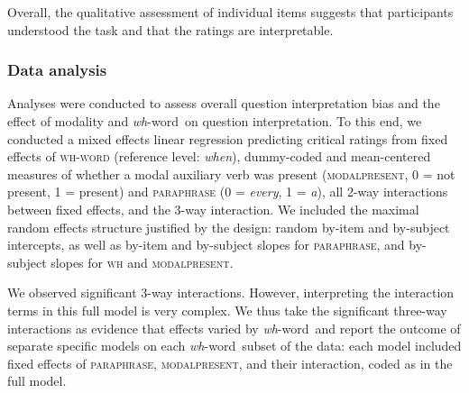\documentclass[12pt,letterpaper,table,svgnames,dvipsnames]{article}
\newcommand{\whw}{\emph{wh}-word~}
\begin{document}
Overall, the qualitative assessment of individual items suggests that participants understood the task and that the ratings are interpretable.

\subsubsection{Data analysis}

Analyses were conducted to assess overall question interpretation bias and the effect of modality and \whw on question interpretation. To this end, we conducted a mixed effects linear regression predicting critical ratings from fixed effects of \textsc{wh-word} (reference level: \emph{when}), dummy-coded and mean-centered measures of whether a modal auxiliary verb was present (\textsc{modalpresent}, 0 = not present, 1 = present) and \textsc{paraphrase} (0 = \emph{every}, 1 = \emph{a}), all 2-way interactions between fixed effects, and the 3-way interaction. We included the maximal random effects structure justified by the design: random by-item and by-subject intercepts, as well as by-item and by-subject slopes for \textsc{paraphrase}, and by-subject slopes for \textsc{wh} and \textsc{modalpresent}. 

We observed significant 3-way interactions. However, interpreting the interaction terms in this full model is very complex. We thus take the significant three-way interactions as evidence that effects varied by \whw and report the outcome of separate specific models on each \whw subset of the data: each model included fixed effects of \textsc{paraphrase}, \textsc{modalpresent}, and their interaction, coded as in the full model. 
\end{document}
